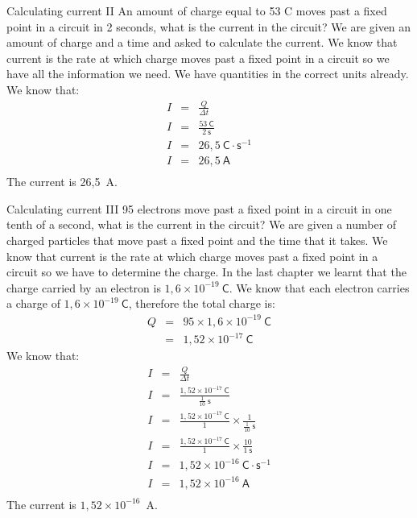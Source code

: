 \begin{wex}{Calculating current II}
{An amount of charge equal to 53 C moves past a fixed point in a circuit in 2 seconds, what is the current in the circuit?
}{%
We are given an amount of charge and a time and asked to calculate the current. We know that current is the rate at which charge moves past a fixed point in a circuit so we have all the information we need. We have quantities in the correct units already.
We know that:
\begin{eqnarray*}
I &=& \frac{Q}{\Delta t} \\
I &=& \frac{53~\mathsf{C}}{2~\mathsf{s}} \\
I &=& 26,5~\mathsf{C} \cdot \mathsf{s}^{-1} \\
I &=& 26,5~\mathsf{A} \\
\end{eqnarray*}
The current is 26,5~A.
}
\end{wex}

\begin{wex}{Calculating current III}
{95 electrons move past a fixed point in a circuit in one tenth of a second, what is the current in the circuit?
}{%
We are given a number of charged particles that move past a fixed point and the time that it takes.
We know that current is the rate at which charge moves past a fixed point in a circuit so we have to determine the 
charge. In the last chapter we learnt that the charge carried by an electron is $1,6\times10^{-19}~\mathsf{C}$.
We know that each electron carries a charge of $1,6\times10^{-19}~\mathsf{C}$, therefore the total charge is:
\begin{eqnarray*}
Q & = & 95 \times 1,6\times10^{-19}~\mathsf{C} \\
& = & 1,52\times10^{-17}~\mathsf{C} 
\end{eqnarray*}
We know that:
\begin{eqnarray*}
I &=& \frac{Q}{\Delta t} \\
I &=& \frac{1,52\times10^{-17}~\mathsf{C}}{\frac{1}{10}~\mathsf{s}} \\
I &=& \frac{1,52\times10^{-17}~\mathsf{C}}{1}\times{\frac{1}{{\frac{1}{10}~\mathsf{s}}}} \\
I &=& \frac{1,52\times10^{-17}~\mathsf{C}}{1}\times\frac{10}{1~\mathsf{s}} \\
I &=& 1,52\times10^{-16}~\mathsf{C} \cdot \mathsf{s}^{-1} \\
I &=& 1,52\times10^{-16}~\mathsf{A} \\
\end{eqnarray*}
The current is $1,52\times10^{-16}$~A.
}
\end{wex}


